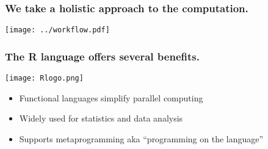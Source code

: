 \documentclass{beamer}
\begin{document}
\begin{frame}

    \frametitle{We take a holistic approach to the computation.}


\centerline{\texttt{[image: ../workflow.pdf]}}

\end{frame}
\begin{frame}

    \frametitle{The R language offers several benefits.}


\centerline{\texttt{[image: Rlogo.png]}}

    \begin{itemize}
        \item Functional languages simplify parallel computing
        \item Widely used for statistics and data analysis
        \item Supports metaprogramming aka ``programming on the
            language''
    \end{itemize}

\end{frame}
\end{document}
